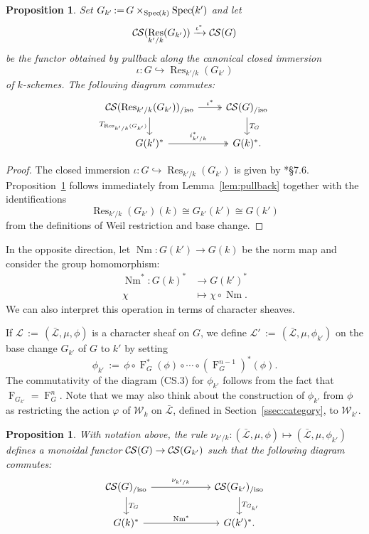 \documentclass[10pt]{amsart}
\theoremstyle{plain}
\newtheorem{proposition}[theorem]{Proposition}
\theoremstyle{definition}
\theoremstyle{remark}
\newcommand{\Weil}[1]{\mathcal{W}_{#1}}
\newcommand{\Frob}[1]{\operatorname{F}_{#1}}
\DeclareMathOperator{\Res}{Res}
\DeclareMathOperator{\Nm}{Nm}
\newcommand{\Spec}[1]{{\operatorname{Spec}\hskip-1pt( #1 )}}
\newcommand{\ceq}{{\, :=\, }}
\newcommand{\TrFrob}[1]{T_{#1}}
\newcommand{\cs}[1]{{\mathcal{#1}}}
\newcommand{\gcs}[1]{{\mathcal{\bar #1}}}
\newcommand{\CS}{{\mathcal{C\hskip-0.8pt S}}}
\newcommand{\CSiso}[1]{\CS(#1)_{/\text{iso}}}
\begin{document}
\begin{proposition} \label{prop:csbe}
Set $G_{k'} \ceq G\times_\Spec{k} \Spec{k'}$ and let
\[
\CS(\Res_{k'/k}(G_{k'})) \xrightarrow{\iota^*} \CS(G)
\]
be the functor obtained by pullback along the canonical closed immersion 
\[\iota : G \hookrightarrow \Res_{k'/k}(G_{k'})\] of $k$-schemes.
The following diagram commutes:
\[
\begin{tikzcd}
\CSiso{\Res_{k'/k}(G_{k'})} \arrow[two heads]{r}{\iota^*} \dar[swap]{\TrFrob{\Res_{k'/k}(G_{k'})}} & \CSiso{G} \dar{\TrFrob{G}} \\
G(k')^* \arrow[two heads]{r}{i_{k'/k}^*} & G(k)^*.
\end{tikzcd}
\]
\end{proposition}
\begin{proof}
The closed immersion $\iota : G \hookrightarrow \Res_{k'/k}(G_{k'})$ is given by \cite{bosch-lutkebohmert-reynaud:NeronModels}*{\S 7.6}.
Proposition~\ref{prop:csbe} follows immediately from Lemma~\ref{lem:pullback} together with the identifications
\[
\Res_{k'/k}(G_{k'})(k) \cong G_{k'}(k') \cong G(k')
\]
from the definitions of Weil restriction and base change.
\end{proof}

In the opposite direction, let $\Nm : G(k') \to G(k)$ be the norm map and consider the group homomorphism:
\begin{align*}
\Nm^* : G(k)^* &\to G(k')^* \\
\chi &\mapsto \chi\circ \Nm.
\end{align*}
We can also interpret this operation in terms of character sheaves.

If $\cs{L} \ceq (\gcs{L}, \mu, \phi)$ is a character sheaf on $G$, we define
$\cs{L}' \ceq (\gcs{L}, \mu, \phi_{k'})$ on the base change
$G_{k'}$ of $G$ to $k'$ by setting
\[
\phi_{k'} \ceq \phi \circ \Frob{G}^*(\phi) \circ \cdots \circ (\Frob{G}^{n-1})^*(\phi).
\]
The commutativity of the diagram (CS.3) for $\phi_{k'}$
follows from the fact that $\Frob{G_{k'}} = \Frob{G}^n$.
Note that we may also think about the construction of $\phi_{k'}$ from $\phi$
as restricting the action $\varphi$ of $\Weil{k}$ on $\gcs{L}$,
defined in Section~\ref{ssec:category}, to $\Weil{k'}$.

\begin{proposition}\label{prop:basechange}
With notation above,
the rule $\nu_{k'/k}: (\gcs{L}, \mu, \phi) \mapsto (\gcs{L}, \mu, \phi_{k'})$
 defines a monoidal functor $\CS(G) \to \CS(G_{k'})$
 such that the following diagram commutes:
\[
\begin{tikzcd}[column sep=60]
\CSiso{G} \rar{\nu_{k'/k}} \dar{\TrFrob{G}} & \CSiso{G_{k'}} \dar{\TrFrob{G_{k'}}} \\
G(k)^*  \rar{\Nm^*} & G(k')^*.
\end{tikzcd}
\]
\end{proposition}
\end{document}
